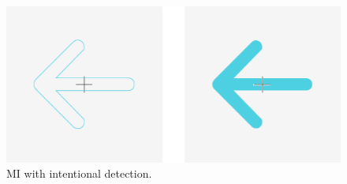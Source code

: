 \begin{figure}[H]
\begin{centering}
% 
\includegraphics[width=1\textwidth]{Appendix/databases/Figures/mi-intentional.png}
\par\end{centering}
\caption{\gls*{MI} with intentional detection.}
\label{}
\end{figure}